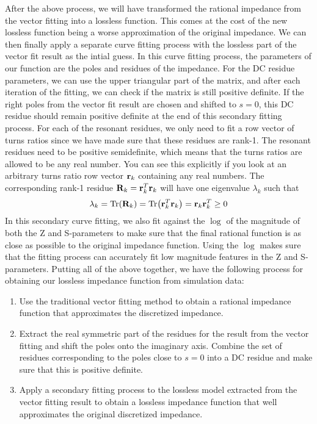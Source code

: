 After the above process, we will have transformed the rational impedance from the vector fitting into a lossless function. This comes at the cost of the new lossless function being a worse approximation of the original impedance. We can then finally apply a separate curve fitting process with the lossless part of the vector fit result as the intial guess. In this curve fitting process, the parameters of our function are the poles and residues of the impedance. For the DC residue parameters, we can use the upper triangular part of the matrix, and after each iteration of the fitting, we can check if the matrix is still positive definite. If the right poles from the vector fit result are chosen and shifted to $s=0$, this DC residue should remain positive definite at the end of this secondary fitting process. For each of the resonant residues, we only need to fit a row vector of turns ratios since we have made sure that these residues are rank-1. The resonant residues need to be positive semidefinite, which means that the turns ratios are allowed to be any real number. You can see this explicitly if you look at an arbitrary turns ratio row vector $\vb{r}_k$ containing any real numbers. The corresponding rank-1 residue $\vb{R}_k = \vb{r}_k^T \vb{r}_k$ will have one eigenvalue $\lambda_k$ such that
\begin{equation}
    \lambda_k = \Tr(\vb{R}_k) = \Tr(\vb{r}_k^T \vb{r}_k) = \vb{r}_k\vb{r}_k^T \geq 0
\end{equation}
In this secondary curve fitting, we also fit against the $\log$ of the magnitude of both the Z and S-parameters to make sure that the final rational function is as close as possible to the original impedance function. Using the $\log$ makes sure that the fitting process can accurately fit low magnitude features in the Z and S- parameters. Putting all of the above together, we have the following process for obtaining our lossless impedance function from simulation data:
\begin{enumerate}
    \item Use the traditional vector fitting method to obtain a rational impedance function that approximates the discretized impedance.
    \item Extract the real symmetric part of the residues for the result from the vector fitting and shift the poles onto the imaginary axis. Combine the set of residues corresponding to the poles close to $s=0$ into a DC residue and make sure that this is positive definite.
    \item Apply a secondary fitting process to the lossless model extracted from the vector fitting result to obtain a lossless impedance function that well approximates the original discretized impedance.
\end{enumerate}
